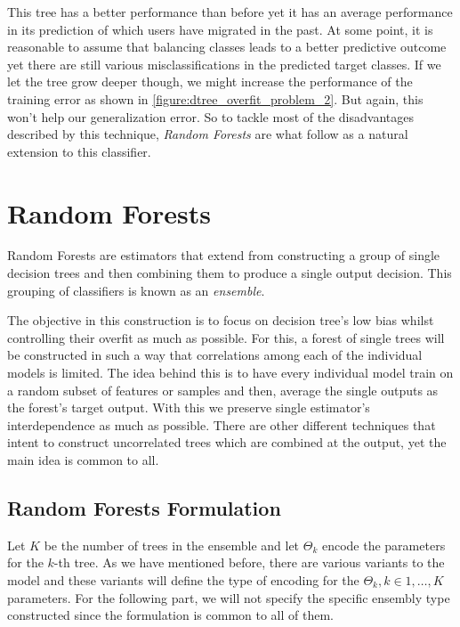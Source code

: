 This tree has a better performance than before yet it has an average performance in its prediction of which users have migrated in the past.
At some point, it is reasonable to assume that balancing classes leads to a better predictive outcome yet there are still various misclassifications in the predicted target classes.
If we let the tree grow deeper though, we might increase the performance of the training error as shown in \cref{figure:dtree_overfit_problem_2}.
But again, this won't help our generalization error.
So to tackle most of the disadvantages described by this technique, \textit{Random Forests} are what follow as a natural extension to this classifier.

\section{ Random Forests}\label{section:random_forests}

Random Forests are estimators that extend from constructing a group of single decision trees and then combining them to produce a single output decision.
This grouping of classifiers is known as an \textit{ensemble}.

The objective in this construction is to focus on decision tree's low bias whilst controlling their overfit as much as possible.
For this, a forest of single trees will be constructed in such a way that correlations among each of the individual models is limited.
The idea behind this is to have every individual model train on a random subset of features or samples and then, average the single outputs as the forest's target output.
With this we preserve single estimator's interdependence as much as possible.
There are other different techniques that intent to construct uncorrelated trees which are combined at the output, yet the main idea is common to all.

\subsection{ Random Forests Formulation}\label{subsection:random_forests_formulation}

Let $K$ be the number of trees in the ensemble and let $\Theta_k$ encode the parameters for the $k$-th tree.
As we have mentioned before, there are various variants to the model and these variants will define the type of encoding for the $\Theta_k, k \in {1,\ldots,K}$  parameters.
For the following part, we will not specify the specific ensembly type constructed since the formulation is common to all of them.

